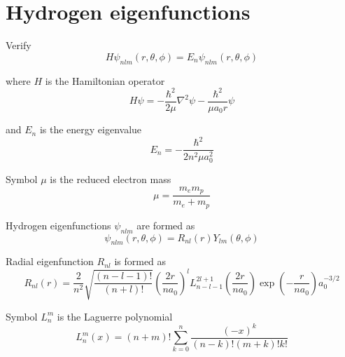

\section*{Hydrogen eigenfunctions}

Verify
\begin{equation*}
H\psi_{nlm}(r,\theta,\phi)=E_n\psi_{nlm}(r,\theta,\phi)
\end{equation*}

where $H$ is the Hamiltonian operator
\begin{equation*}
H\psi=-\frac{\hbar^2}{2\mu}\nabla^2\psi-\frac{\hbar^2}{\mu a_0r}\psi
\end{equation*}

and $E_n$ is the energy eigenvalue
\begin{equation*}
E_n=-\frac{\hbar^2}{2n^2\mu a_0^2}
\end{equation*}

Symbol $\mu$ is the reduced electron mass
\begin{equation*}
\mu=\frac{m_e m_p}{m_e+m_p}
\end{equation*}

Hydrogen eigenfunctions $\psi_{nlm}$ are formed as
\begin{equation*}
\psi_{nlm}(r,\theta,\phi)=R_{nl}(r)Y_{lm}(\theta,\phi)
\end{equation*}

\iffalse
Quantum number $n$ is the principal quantum number.
\begin{equation*}
n=1,2,3,\ldots
\end{equation*}

Quantum number $l$ is the angular momentum quantum number.
\begin{equation*}
l=0,1,\ldots,n-1
\end{equation*}

Quantum number $m$ is the magnetic quantum number.
\begin{equation*}
m=-l,\ldots,0,\ldots,l
\end{equation*}
\fi

Radial eigenfunction $R_{nl}$ is formed as
\begin{equation*}
R_{nl}(r)=
\frac{2}{n^2}
\sqrt{\frac{(n-l-1)!}{(n+l)!}}
\left(\frac{2r}{na_0}\right)^l
L_{n-l-1}^{2l+1}\left(\frac{2r}{na_0}\right)
\exp\left(-\frac{r}{na_0}\right)
a_0^{-3/2}
\end{equation*}

Symbol $L_n^m$ is the Laguerre polynomial
\begin{equation*}
L_n^m(x)=(n+m)!\sum_{k=0}^n
\frac{(-x)^k}{(n-k)!(m+k)!k!}
\end{equation*}

